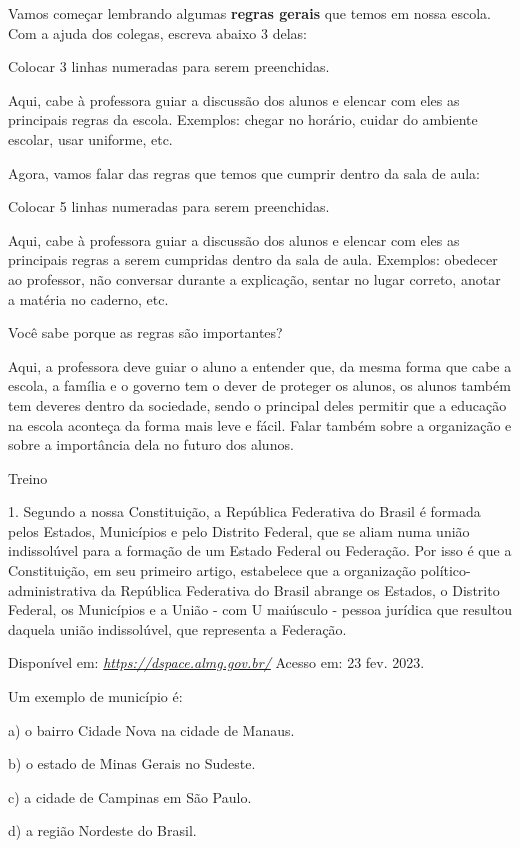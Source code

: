 Vamos começar lembrando algumas \textbf{regras gerais} que temos em
nossa escola. Com a ajuda dos colegas, escreva abaixo 3 delas:

Colocar 3 linhas numeradas para serem preenchidas.

Aqui, cabe à professora guiar a discussão dos alunos e elencar com eles
as principais regras da escola. Exemplos: chegar no horário, cuidar do
ambiente escolar, usar uniforme, etc.

Agora, vamos falar das regras que temos que cumprir dentro da sala de
aula:

Colocar 5 linhas numeradas para serem preenchidas.

Aqui, cabe à professora guiar a discussão dos alunos e elencar com eles
as principais regras a serem cumpridas dentro da sala de aula. Exemplos:
obedecer ao professor, não conversar durante a explicação, sentar no
lugar correto, anotar a matéria no caderno, etc.

Você sabe porque as regras são importantes?

Aqui, a professora deve guiar o aluno a entender que, da mesma forma que
cabe a escola, a família e o governo tem o dever de proteger os alunos,
os alunos também tem deveres dentro da sociedade, sendo o principal
deles permitir que a educação na escola aconteça da forma mais leve e
fácil. Falar também sobre a organização e sobre a importância dela no
futuro dos alunos.

Treino

1. Segundo a nossa Constituição, a República Federativa do Brasil é
formada pelos Estados, Municípios e pelo Distrito Federal, que se aliam
numa união indissolúvel para a formação de um Estado Federal ou
Federação. Por isso é que a Constituição, em seu primeiro artigo,
estabelece que a organização político-administrativa da República
Federativa do Brasil abrange os Estados, o Distrito Federal, os
Municípios e a União - com U maiúsculo - pessoa jurídica que resultou
daquela união indissolúvel, que representa a Federação.

Disponível em:
\href{https://dspace.almg.gov.br/}{\emph{https://dspace.almg.gov.br/}}
Acesso em: 23 fev. 2023.

Um exemplo de município é:

a) o bairro Cidade Nova na cidade de Manaus.

b) o estado de Minas Gerais no Sudeste.

c) a cidade de Campinas em São Paulo.

d) a região Nordeste do Brasil.

